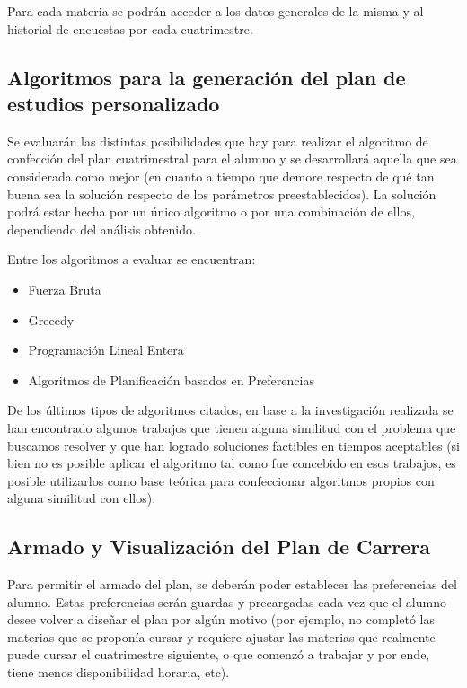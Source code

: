 \documentclass[a4paper]{article}
\begin{document}
Para cada materia se podrán acceder a los datos generales de la misma y al historial de encuestas por cada cuatrimestre.

\subsection{Algoritmos para la generación del plan de estudios personalizado}

Se evaluarán las distintas posibilidades que hay para realizar el algoritmo de confección del plan cuatrimestral para el alumno y se desarrollará aquella que sea considerada como mejor (en cuanto a tiempo que demore respecto de qué tan buena sea la solución respecto de los parámetros preestablecidos). La solución podrá estar hecha por un único algoritmo o por una combinación de ellos, dependiendo del análisis obtenido.

Entre los algoritmos a evaluar se encuentran:

\begin{itemize}
	\item Fuerza Bruta
	\item Greeedy
	\item Programación Lineal Entera
	\item Algoritmos de Planificación basados en Preferencias
\end{itemize}

De los últimos tipos de algoritmos citados, en base a la investigación realizada se han encontrado algunos trabajos que tienen alguna similitud con el problema que buscamos resolver y que han logrado soluciones factibles en tiempos aceptables (si bien no es posible aplicar el algoritmo tal como fue concebido en esos trabajos, es posible utilizarlos como base teórica para confeccionar algoritmos propios con alguna similitud con ellos).

\subsection{Armado y Visualización del Plan de Carrera}

Para permitir el armado del plan, se deberán poder establecer las preferencias del alumno. Estas preferencias serán guardas y precargadas cada vez que el alumno desee volver a diseñar el plan por algún motivo (por ejemplo, no completó las materias que se proponía cursar y requiere ajustar las materias que realmente puede cursar el cuatrimestre siguiente, o que comenzó a trabajar y por ende, tiene menos disponibilidad horaria, etc).
\end{document}
